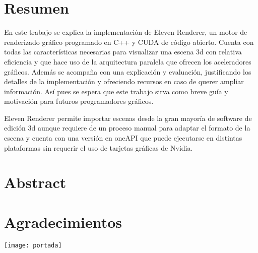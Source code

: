 \chapter*{Resumen}

En este trabajo se explica la implementación de Eleven Renderer, un motor de renderizado gráfico programado en C++ y CUDA de código abierto. Cuenta con todas las características necesarias para visualizar una escena 3d con relativa eficiencia y que hace uso de la arquitectura paralela que ofrecen los aceleradores gráficos. Además se acompaña con una explicación y evaluación, justificando los detalles de la implementación y ofreciendo recursos en caso de querer ampliar información. Así pues se espera que este trabajo sirva como breve guía y motivación para futuros programadores gráficos.

Eleven Renderer permite importar escenas desde la gran mayoría de software de edición 3d aunque requiere de un proceso manual para adaptar el formato de la escena y cuenta con una versión en oneAPI que puede ejecutarse en distintas plataformas sin requerir el uso de tarjetas gráficas de Nvidia.


\chapter*{Abstract}


\chapter*{Agradecimientos}


\newpage

\texttt{[image: portada]}

\scalebox{5}{Eleven Renderer}

